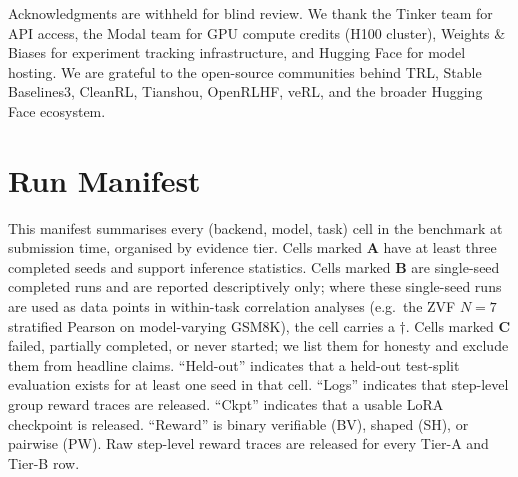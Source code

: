 \documentclass{article}
\begin{document}
 
\label{sec:acknowledgments}
\begin{ack}
Acknowledgments are withheld for blind review. We thank the Tinker team for
API access, the Modal team for GPU compute credits (H100 cluster), Weights
\& Biases for experiment tracking infrastructure, and Hugging Face for model
hosting. We are grateful to the open-source communities behind TRL, Stable
Baselines3, CleanRL, Tianshou, OpenRLHF, veRL, and the broader Hugging Face
ecosystem.
\end{ack}




\appendix


\section{Run Manifest}
\label{sec:run-manifest}

This manifest summarises every (backend, model, task) cell in the benchmark
at submission time, organised by evidence tier. Cells marked \textbf{A} have at
least three completed seeds and support inference statistics. Cells marked
\textbf{B} are single-seed completed runs and are reported descriptively only;
where these single-seed runs are used as data points in within-task
correlation analyses (e.g.\ the ZVF $N{=}7$ stratified Pearson on
model-varying GSM8K), the cell carries a $\dagger$. Cells marked
\textbf{C} failed, partially completed, or never started; we list
them for honesty and exclude them from headline claims. ``Held-out'' indicates
that a held-out test-split evaluation exists for at least one seed in that cell.
``Logs'' indicates that step-level group reward traces are released.
``Ckpt'' indicates that a usable LoRA checkpoint is released.
``Reward'' is binary verifiable (BV), shaped (SH), or pairwise (PW). Raw
step-level reward traces are released for every Tier-A and Tier-B row.
\end{document}
